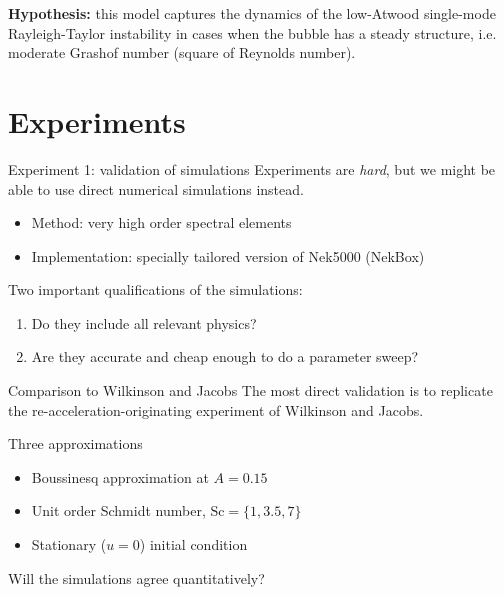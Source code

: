 \documentclass[12pt]{beamer}
\begin{document}
\begin{frame}
\textbf{Hypothesis:} this model captures the dynamics of the low-Atwood single-mode Rayleigh-Taylor instability in cases when the bubble has a steady structure, i.e. moderate Grashof number (square of Reynolds number).
\end{frame}

\section{Experiments}

\begin{frame}{Experiment 1: validation of simulations}
Experiments are \textit{hard}, but we might be able to use direct numerical simulations
 instead.
\begin{itemize}
  \item Method: very high order spectral elements
  \item Implementation: specially tailored version of Nek5000 (NekBox)
\end{itemize}
\vspace{20pt}\pause

Two important qualifications of the simulations:
\begin{enumerate}
  \item Do they include all relevant physics?
  \item Are they accurate and cheap enough to do a parameter sweep?
\end{enumerate}
\end{frame}

\begin{frame}{Comparison to Wilkinson and Jacobs}
The most direct validation is to replicate the re-acceleration-originating experiment of Wilkinson and Jacobs.

\begin{block}{Three approximations}
\begin{itemize}
  \item Boussinesq approximation at $A = 0.15$
  \item Unit order Schmidt number, $\text{Sc} = \{1,3.5,7\}$
  \item Stationary ($u = 0$) initial condition
\end{itemize}
\end{block}

\begin{exampleblock}{}
Will the simulations agree quantitatively?
\end{exampleblock}
\end{frame}
\end{document}
